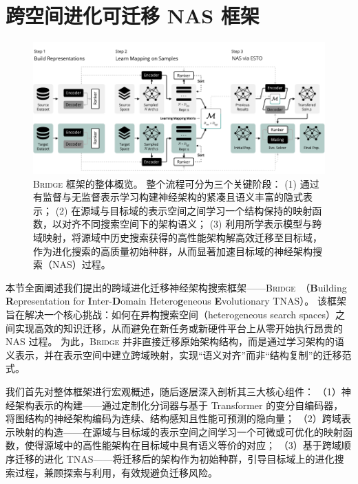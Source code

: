 \documentclass[../main.tex]{subfiles}
\begin{document}
\section[\hspace{-2pt}跨空间进化可迁移 NAS 框架]{\heiti{}\hspace{-8pt}跨空间进化可迁移 NAS 框架}

\begin{figure}[htbp]
	\centering
	\includegraphics[width=\textwidth]{BRIDGE/overview-fixed.pdf}
	\caption{
		\textsc{Bridge} 框架的整体概览。
		整个流程可分为三个关键阶段：
		(1) 通过有监督与无监督表示学习构建神经架构的紧凑且语义丰富的隐式表示；
		(2) 在源域与目标域的表示空间之间学习一个结构保持的映射函数，以对齐不同搜索空间下的架构语义；
		(3) 利用所学表示模型与跨域映射，将源域中历史搜索获得的高性能架构解高效迁移至目标域，作为进化搜索的高质量初始种群，从而显著加速目标域的神经架构搜索（NAS）过程。
	}\label{fig:overview}
\end{figure}

本节全面阐述我们提出的跨域进化迁移神经架构搜索框架——\textsc{Bridge}~（\textbf{B}uilding \textbf{R}epresentation for \textbf{I}nter-\textbf{D}omain Hetero\textbf{g}eneous \textbf{E}volutionary TNAS）。
该框架旨在解决一个核心挑战：如何在异构搜索空间（heterogeneous search spaces）之间实现高效的知识迁移，从而避免在新任务或新硬件平台上从零开始执行昂贵的 NAS 过程。
为此，\textsc{Bridge} 并非直接迁移原始架构结构，而是通过学习架构的语义表示，并在表示空间中建立跨域映射，实现“语义对齐”而非“结构复制”的迁移范式。

我们首先对整体框架进行宏观概述，随后逐层深入剖析其三大核心组件：
（1）神经架构表示的构建——通过定制化分词器与基于 Transformer 的变分自编码器，将图结构的神经架构编码为连续、结构感知且性能可预测的隐向量；
（2）跨域表示映射的构造——在源域与目标域的表示空间之间学习一个可微或可优化的映射函数，使得源域中的高性能架构在目标域中具有语义等价的对应；
（3）基于跨域顺序迁移的进化 TNAS——将迁移后的架构作为初始种群，引导目标域上的进化搜索过程，兼顾探索与利用，有效规避负迁移风险。
\end{document}
